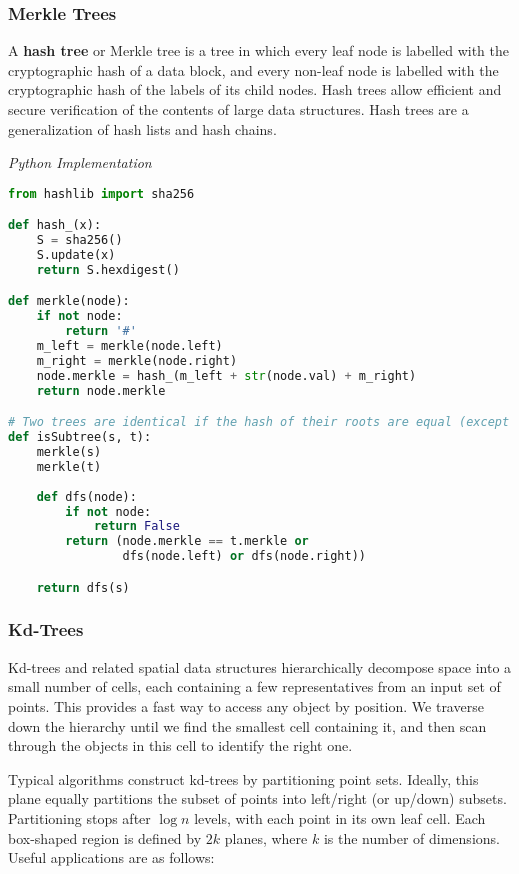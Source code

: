 \documentclass{article}
\begin{document}
    \subsubsection{Merkle Trees}
    A \textbf{hash tree} or Merkle tree is a tree in which every leaf node is labelled with the cryptographic hash of a data block, and every non-leaf node is labelled with the cryptographic hash of the labels of its child nodes. Hash trees allow efficient and secure verification of the contents of large data structures. Hash trees are a generalization of hash lists and hash chains.
    
\vspace{8pt} \emph{Python Implementation}
\begin{lstlisting}[language=Python]
from hashlib import sha256

def hash_(x):
    S = sha256()
    S.update(x)
    return S.hexdigest()

def merkle(node):
    if not node:
        return '#'
    m_left = merkle(node.left)
    m_right = merkle(node.right)
    node.merkle = hash_(m_left + str(node.val) + m_right)
    return node.merkle

# Two trees are identical if the hash of their roots are equal (except for collisions)
def isSubtree(s, t):
    merkle(s)
    merkle(t)
    
    def dfs(node):
        if not node:
            return False
        return (node.merkle == t.merkle or
                dfs(node.left) or dfs(node.right))

    return dfs(s)
\end{lstlisting}

\subsubsection{Kd-Trees}
    Kd-trees and related spatial data structures hierarchically decompose space into a small number of cells, each containing a few representatives from an input set of points. This provides a fast way to access any object by position. We traverse down the hierarchy until we find the smallest cell containing it, and then scan through the objects in this cell to identify the right one.
    
    Typical algorithms construct kd-trees by partitioning point sets. Ideally, this plane equally partitions the subset of points into left/right (or up/down) subsets. Partitioning stops after $\log n$ levels, with each point in its own leaf cell. Each box-shaped region is defined by $2k$ planes, where $k$ is the number of dimensions. Useful applications are as follows:
    
\end{document}

